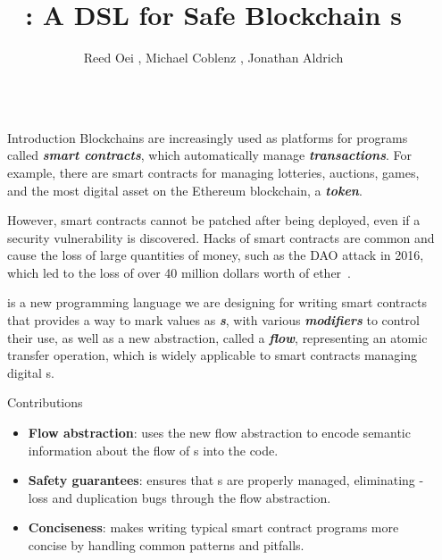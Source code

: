 \documentclass[usenames, dvipsnames, final]{beamer}
\title{\langName: A DSL for Safe Blockchain \AssetTxt{}s}
\author{Reed Oei \inst{1}, Michael Coblenz \inst{2}, Jonathan Aldrich \inst{2}}
\institute[shortinst]{\inst{1} University of Illinois \samelineand \inst{2} Carnegie Mellon University}
\newlength{\sepwidth}
\newlength{\colwidth}
\newcommand{\separatorcolumn}{\begin{column}{\sepwidth}\end{column}}
\newcommand{\term}[1]{\textbf{\emph{#1}}}
\begin{document}
\begin{frame}[t]
\begin{columns}[t]
\separatorcolumn

\begin{column}{\colwidth}

    \begin{block}{Introduction}
        Blockchains are increasingly used as platforms for programs called \term{smart contracts}, which automatically manage \term{transactions}. %
        For example, there are smart contracts for managing lotteries, auctions, games, and the most digital asset on the Ethereum blockchain, a \term{token}.

        However, smart contracts cannot be patched after being deployed, even if a security vulnerability is discovered.
        Hacks of smart contracts are common and cause the loss of large quantities of money, such as the DAO attack in 2016, which led to the loss of over 40 million dollars worth of ether~\cite{DAO}.

        \textcolor{softRed}{\textbf{\langName}} is a new programming language we are designing for writing smart contracts that provides a way to mark values as \term{\assetTxt{}s}, with various \term{modifiers} to control their use, as well as a new abstraction, called a \term{flow}, representing an atomic transfer operation, which is widely applicable to smart contracts managing digital \assetTxt{}s.
    \end{block}

    \begin{alertblock}{Contributions}
        \begin{itemize}
            \item \textbf{Flow abstraction}: \langName uses the new flow abstraction to encode semantic information about the flow of \assetTxt{}s into the code.
            \item \textbf{Safety guarantees}: \langName ensures that \assetTxt{}s are properly managed, eliminating \assetTxt-loss and duplication bugs through the flow abstraction.
            \item \textbf{Conciseness}: \langName makes writing typical smart contract programs more concise by handling common patterns and pitfalls.
        \end{itemize}
    \end{alertblock}
\end{column}


\end{columns}
\end{frame}
\end{document}
